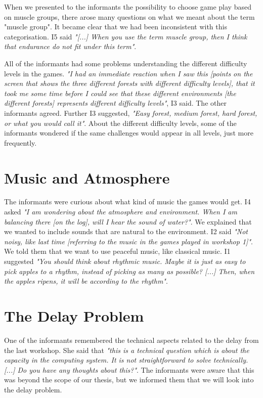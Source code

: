 When we presented to the informants the possibility to choose game play based on muscle groups, there arose many questions on what we meant about the term "muscle group". It became clear that we had been inconsistent with this categorisation. I5 said \emph{"[...] When you use the term muscle group, then I think that endurance do not fit under this term"}.   

All of the informants had some problems understanding the different difficulty levels in the games. \emph{"I had an immediate reaction when I saw this [points on the screen that shows the three different forests with different difficulty levels], that it took me some time before I could see that these different environments [the different forests] represents different difficulty levels"}, I3 said. The other informants agreed. Further I3 suggested, \emph{"Easy forest, medium forest, hard forest, or what you would call it"}. About the different difficulty levels, some of the informants wondered if the same challenges would appear in all levels, just more frequently. 

\section{Music and Atmosphere}

The informants were curious about what kind of music the games would get. I4 asked \emph{"I am wondering about the atmosphere and environment. When I am balancing there [on the log], will I hear the sound of water?"}. We explained that we wanted to include sounds that are natural to the environment. I2 said \emph{"Not noisy, like last time [referring to the music in the games played in workshop 1]"}. We told them that we want to use peaceful music, like classical music. I1 suggested \emph{"You should think about rhythmic music. Maybe it is just as easy to pick apples to a rhythm, instead of picking as many as possible? [...] Then, when the apples ripens, it will be according to the rhythm"}. 

\section{The Delay Problem}


One of the informants remembered the technical aspects related to the delay from the last workshop. She said that \emph{"this is a technical question which is about the capacity in the computing system. It is not straightforward to solve technically. [...] Do you have any thoughts about this?"}. The informants were aware that this was beyond the scope of our thesis, but we informed them that we will look into the delay problem.

